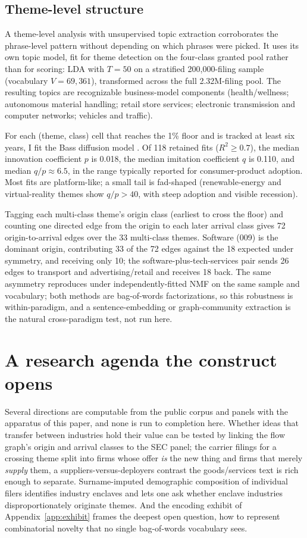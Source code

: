 \documentclass[11pt]{article}
\begin{document}
\subsection{Theme-level structure}

A theme-level analysis with unsupervised topic extraction corroborates the
phrase-level pattern without depending on which phrases were picked. It
uses its own topic model, fit for theme detection on the four-class
granted pool rather than for scoring: LDA with $T = 50$ on a stratified
200{,}000-filing sample (vocabulary $V = 69{,}361$), transformed across
the full 2.32M-filing pool. The resulting topics are recognizable
business-model components (health/wellness; autonomous material handling;
retail store services; electronic transmission and computer networks;
vehicles and traffic).

For each (theme, class) cell that reaches the 1\% floor and is tracked at
least six years, I fit the Bass diffusion model \citep{Bass1969}. Of 118
retained fits ($R^2 \geq 0.7$), the median innovation coefficient $p$ is
0.018, the median imitation coefficient $q$ is 0.110, and median
$q/p \approx 6.5$, in the range typically reported for consumer-product
adoption. Most fits are platform-like; a small tail is fad-shaped
(renewable-energy and virtual-reality themes show $q/p > 40$, with steep
adoption and visible recession).

Tagging each multi-class theme's origin class (earliest to cross the
floor) and counting one directed edge from the origin to each later
arrival class gives 72 origin-to-arrival edges over the 33 multi-class
themes. Software (009) is the dominant origin, contributing 33 of the 72
edges against the 18 expected under symmetry, and receiving only 10; the
software-plus-tech-services pair sends 26 edges to transport and
advertising/retail and receives 18 back. The same asymmetry reproduces
under independently-fitted NMF on the same sample and vocabulary; both
methods are bag-of-words factorizations, so this robustness is
within-paradigm, and a sentence-embedding or graph-community extraction is
the natural cross-paradigm test, not run here.

\section{A research agenda the construct opens}\label{sec:agenda}

Several directions are computable from the public corpus and panels with
the apparatus of this paper, and none is run to completion here. Whether
ideas that transfer between industries hold their value can be tested by
linking the flow graph's origin and arrival classes to the SEC panel; the
carrier filings for a crossing theme split into firms whose offer
\emph{is} the new thing and firms that merely \emph{supply} them, a
suppliers-versus-deployers contrast the goods/services text is rich enough
to separate. Surname-imputed demographic composition of individual filers
identifies industry enclaves and lets one ask whether enclave industries
disproportionately originate themes. And the encoding exhibit of
Appendix~\ref{app:exhibit} frames the deepest open question, how to
represent combinatorial novelty that no single bag-of-words vocabulary
sees.
\end{document}

